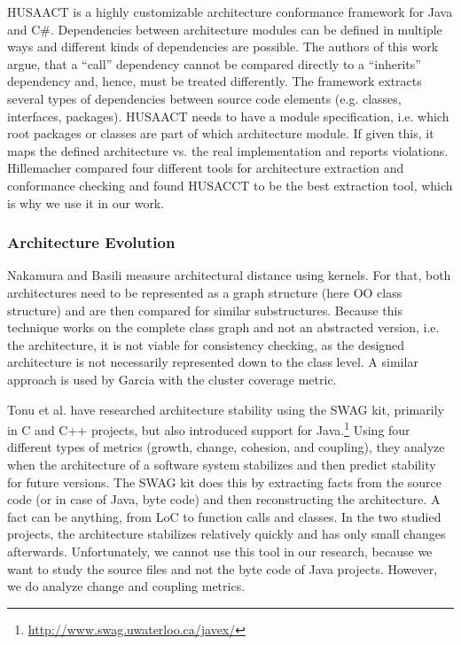 \documentclass[sigplan, anonymous, review]{acmart}
\begin{document}
HUSAACT \cite{Husacct1,Husacct2} is a highly customizable architecture conformance framework for Java and C\#. Dependencies between architecture modules can be defined in multiple ways and different kinds of dependencies are possible. The authors of this work argue, that a ``call'' dependency cannot be compared directly to a ``inherits'' dependency and, hence, must be treated differently. 
The framework extracts several types of dependencies between source code elements (e.g. classes, interfaces, packages). HUSAACT needs to have a module specification, i.e. which root packages or classes are part of which architecture module. If given this, it maps the defined architecture vs. the real implementation and reports violations.
Hillemacher \cite{MScSteffen} compared four different tools for architecture extraction and conformance checking and found HUSACCT to be the best extraction tool, which is why we use it in our work.

\subsubsection{Architecture Evolution}

Nakamura and Basili \cite{StructDist} measure architectural distance using kernels. For that, both architectures need to be represented as a graph structure (here OO class structure) and are then compared for similar substructures. 
Because this technique works on the complete class graph and not an abstracted version, i.e. the architecture, it is not viable for consistency checking, as the designed architecture is not necessarily represented down to the class level. 
A similar approach is used by Garcia \cite{arcade-thesis} with the cluster coverage metric.



Tonu et al. \cite{Swag} have researched architecture stability using the SWAG kit, primarily in C and C++ projects, but also introduced support for Java.\footnote{\url{http://www.swag.uwaterloo.ca/javex/}} Using four different types of metrics (growth, change, cohesion, and coupling), they analyze when the architecture of a software system stabilizes and then predict stability for future versions. The SWAG kit does this by extracting facts from the source code (or in case of Java, byte code) and then reconstructing the architecture. A fact can be anything, from LoC to function calls and classes. 
In the two studied projects, the architecture stabilizes relatively quickly and has only small changes afterwards. Unfortunately, we cannot use this tool in our research, because we want to study the source files and not the byte code of Java projects. However, we do analyze change and coupling metrics.
\end{document}
